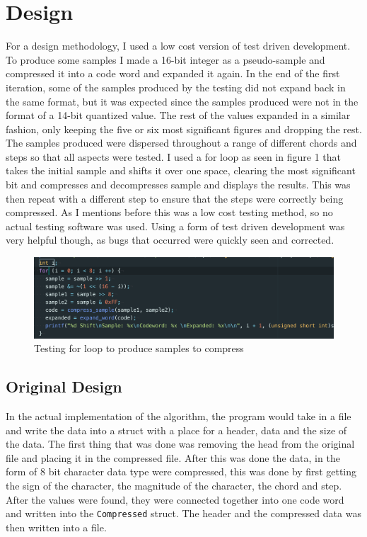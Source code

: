\documentclass[12pt]{article}
\begin{document}
\section{Design}

For a design methodology, I used a low cost version of test driven development. To produce some samples I made a 16-bit integer as a pseudo-sample and compressed it into a code word and expanded it again. In the end of the first iteration, some of the samples produced by the testing did not expand back in the same format, but it was expected since the samples produced were not in the format of a 14-bit quantized value. The rest of the values expanded in a similar fashion, only keeping the five or six most significant figures and dropping the rest. The samples produced were dispersed throughout a range of different chords and steps so that all aspects were tested. I used a for loop as seen in figure 1 that takes the initial sample and shifts it over one space, clearing the most significant bit and compresses and decompresses sample and displays the results. This was then repeat with a different step to ensure that the steps were correctly being compressed. As I mentions before this was a low cost testing method, so no actual testing software was used. Using a form of test driven development was very helpful though, as bugs that occurred were quickly seen and corrected.\\

\begin{figure}[!h]
        \includegraphics[width=\textwidth]
        {testingLoop.png}
        \caption{\label{fig:my-label} Testing for loop to produce samples to compress}
\end{figure}


\subsection{Original Design}

In the actual implementation of the algorithm, the program would take in a file and write the data into a struct with a place for a header, data and the size of the data. The first thing that was done was removing the head from the original file and placing it in the compressed file. After this was done the data, in the form of 8 bit character data type were compressed, this was done by first getting the sign of the character, the magnitude of the character, the chord and step. After the values were found, they were connected together into one code word and written into the \texttt{Compressed} struct. The header and the compressed data was then written into a file.\\
\end{document}
